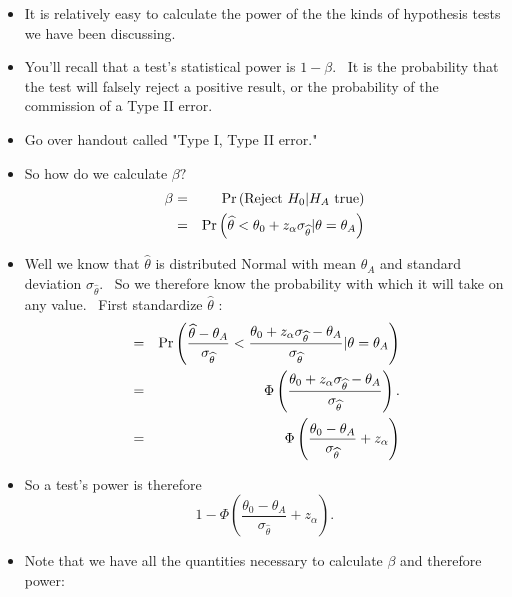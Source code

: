 \documentclass[11pt]{article}
\begin{document}
\begin{itemize}
\item It is relatively easy to calculate the power of the the kinds of
hypothesis tests we have been discussing.

\item You'll recall that a test's statistical power is $1-\beta .$ \ It is
the probability that the test will falsely reject a positive result, or the
probability of the commission of a Type II error.

\item Go over handout called "Type I, Type II error."

\item So how do we calculate $\beta ?$%
\begin{eqnarray*}
\beta &=&\Pr \left( \text{Reject }H_{0}|H_{A}\text{ true}\right) \\
&=&\Pr \left( \widehat{\theta }<\theta _{0}+z_{\alpha }\sigma _{\widehat{%
\theta }}|\theta =\theta _{A}\right)
\end{eqnarray*}

\item Well we know that $\widehat{\theta }$ is distributed Normal with mean $%
\theta _{A}$ and standard deviation $\sigma _{\widehat{\theta }}.$ \ So we
therefore know the probability with which it will take on any value. \ First
standardize $\widehat{\theta }$ :%
\begin{eqnarray*}
&=&\Pr \left( \frac{\widehat{\theta }-\theta _{A}}{\sigma _{\widehat{\theta }%
}}<\frac{\theta _{0}+z_{\alpha }\sigma _{\widehat{\theta }}-\theta _{A}}{%
\sigma _{\widehat{\theta }}}|\theta =\theta _{A}\right) \\
&=&\Phi \left( \frac{\theta _{0}+z_{\alpha }\sigma _{\widehat{\theta }%
}-\theta _{A}}{\sigma _{\widehat{\theta }}}\right) . \\
&=&\Phi \left( \frac{\theta _{0}-\theta _{A}}{\sigma _{\widehat{\theta }}}%
+z_{\alpha }\right)
\end{eqnarray*}

\item So a test's power is therefore 
\begin{equation*}
1-\Phi \left( \frac{\theta _{0}-\theta _{A}}{\sigma _{\widehat{\theta }}}%
+z_{\alpha }\right) .
\end{equation*}

\item Note that we have all the quantities necessary to calculate $\beta $
and therefore power:


\end{itemize}
\end{document}
